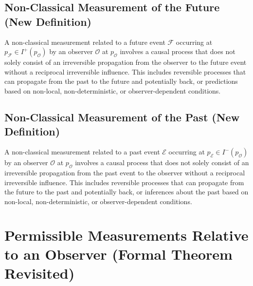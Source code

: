 	\subsection{Non-Classical Measurement of the Future (New Definition)}
	
	\begin{definition}
		A non-classical measurement related to a future event $\mathcal{F}$ occurring at $p_{\mathcal{F}} \in I^+(p_{\mathcal{O}})$ by an observer $\mathcal{O}$ at $p_{\mathcal{O}}$ involves a causal process that does not solely consist of an irreversible propagation from the observer to the future event without a reciprocal irreversible influence. This includes reversible processes that can propagate from the past to the future and potentially back, or predictions based on non-local, non-deterministic, or observer-dependent conditions.
	\end{definition}
	
	\subsection{Non-Classical Measurement of the Past (New Definition)}
	
	\begin{definition}
		A non-classical measurement related to a past event $\mathcal{E}$ occurring at $p_{\mathcal{E}} \in I^-(p_{\mathcal{O}})$ by an observer $\mathcal{O}$ at $p_{\mathcal{O}}$ involves a causal process that does not solely consist of an irreversible propagation from the past event to the observer without a reciprocal irreversible influence. This includes reversible processes that can propagate from the future to the past and potentially back, or inferences about the past based on non-local, non-deterministic, or observer-dependent conditions.
	\end{definition}
	
	\section{Permissible Measurements Relative to an Observer (Formal Theorem Revisited)}
	
